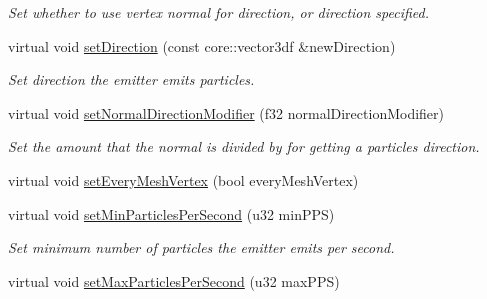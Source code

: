 \begin{DoxyCompactItemize}
\begin{DoxyCompactList}\small\item\em Set whether to use vertex normal for direction, or direction specified. \end{DoxyCompactList}\item 
\hypertarget{classirr_1_1scene_1_1_c_particle_mesh_emitter_a50e32c30e32235c882e3577776af522b}{virtual void \hyperlink{classirr_1_1scene_1_1_c_particle_mesh_emitter_a50e32c30e32235c882e3577776af522b}{set\-Direction} (const core\-::vector3df \&new\-Direction)}\label{classirr_1_1scene_1_1_c_particle_mesh_emitter_a50e32c30e32235c882e3577776af522b}

\begin{DoxyCompactList}\small\item\em Set direction the emitter emits particles. \end{DoxyCompactList}\item 
\hypertarget{classirr_1_1scene_1_1_c_particle_mesh_emitter_a3a2591e6e42a0fc3a41096b7e784693f}{virtual void \hyperlink{classirr_1_1scene_1_1_c_particle_mesh_emitter_a3a2591e6e42a0fc3a41096b7e784693f}{set\-Normal\-Direction\-Modifier} (f32 normal\-Direction\-Modifier)}\label{classirr_1_1scene_1_1_c_particle_mesh_emitter_a3a2591e6e42a0fc3a41096b7e784693f}

\begin{DoxyCompactList}\small\item\em Set the amount that the normal is divided by for getting a particles direction. \end{DoxyCompactList}\item 
virtual void \hyperlink{classirr_1_1scene_1_1_c_particle_mesh_emitter_acfd048a70854c76843d8949605125f97}{set\-Every\-Mesh\-Vertex} (bool every\-Mesh\-Vertex)
\item 
\hypertarget{classirr_1_1scene_1_1_c_particle_mesh_emitter_a453c2afeea271524f22bf2385dfb055b}{virtual void \hyperlink{classirr_1_1scene_1_1_c_particle_mesh_emitter_a453c2afeea271524f22bf2385dfb055b}{set\-Min\-Particles\-Per\-Second} (u32 min\-P\-P\-S)}\label{classirr_1_1scene_1_1_c_particle_mesh_emitter_a453c2afeea271524f22bf2385dfb055b}

\begin{DoxyCompactList}\small\item\em Set minimum number of particles the emitter emits per second. \end{DoxyCompactList}\item 
\hypertarget{classirr_1_1scene_1_1_c_particle_mesh_emitter_ad30b7330a15a3e669ccda155bf852e20}{virtual void \hyperlink{classirr_1_1scene_1_1_c_particle_mesh_emitter_ad30b7330a15a3e669ccda155bf852e20}{set\-Max\-Particles\-Per\-Second} (u32 max\-P\-P\-S)}\label{classirr_1_1scene_1_1_c_particle_mesh_emitter_ad30b7330a15a3e669ccda155bf852e20}


\end{DoxyCompactItemize}
